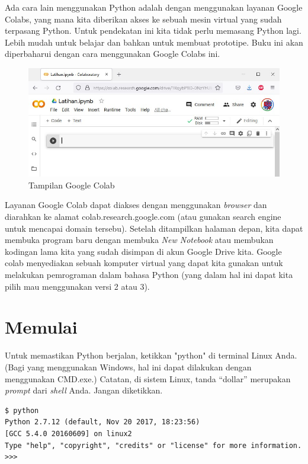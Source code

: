 Ada cara lain menggunakan Python adalah dengan menggunakan layanan
Google Colabs, yang mana kita diberikan akses ke sebuah mesin virtual
yang sudah terpasang Python. Untuk pendekatan ini kita tidak perlu memasang
Python lagi. Lebih mudah untuk belajar dan bahkan untuk membuat prototipe.
Buku ini akan diperbaharui dengan cara menggunakan Google Colabs ini.

\begin{figure}
\includegraphics[width=1.0\linewidth]{graphics/google-colab.jpg}
\caption{Tampilan Google Colab}
\end{figure}

Layanan Google Colab dapat diakses dengan menggunakan {\em browser} dan
diarahkan ke alamat colab.research.google.com (atau gunakan search engine
untuk mencapai domain tersebu).
Setelah ditampilkan halaman depan, kita dapat membuka program baru dengan
membuka {\em New Notebook} atau membukan kodingan lama kita yang sudah
disimpan di akun Google Drive kita.
Google colab menyediakan sebuah komputer virtual yang dapat kita gunakan
untuk melakukan pemrograman dalam bahasa Python (yang dalam hal ini dapat
kita pilih mau menggunakan versi 2 atau 3).

\section{Memulai}
Untuk memastikan Python berjalan, ketikkan "python" di terminal Linux Anda.
(Bagi yang menggunakan Windows, hal ini dapat dilakukan dengan menggunakan
CMD.exe.) Catatan, di sistem Linux, tanda ``dollar'' merupakan {\em prompt}
dari {\em shell} Anda. Jangan diketikkan.

\begin{verbatim}
$ python
Python 2.7.12 (default, Nov 20 2017, 18:23:56) 
[GCC 5.4.0 20160609] on linux2
Type "help", "copyright", "credits" or "license" for more information.
>>> 
\end{verbatim}

